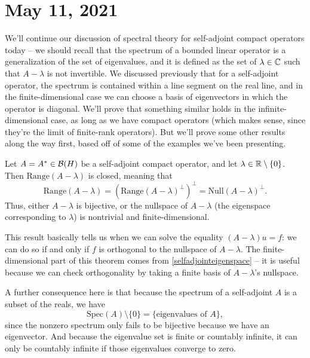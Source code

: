 \pagebreak\section*{May 11, 2021}

We'll continue our discussion of spectral theory for self-adjoint compact operators today -- we should recall that the spectrum of a bounded linear operator is a generalization of the set of eigenvalues, and it is defined as the set of $\lambda \in \mathbb C$ such that $A - \lambda$ is not invertible. We discussed previously that for a self-adjoint operator, the spectrum is contained within a line segment on the real line, and in the finite-dimensional case we can choose a basis of eigenvectors in which the operator is diagonal. We'll prove that something similar holds in the infinite-dimensional case, as long as we have compact operators (which makes sense, since they're the limit of finite-rank operators). But we'll prove some other results along the way first, based off of some of the examples we've been presenting.

\begin{theorem}
Let $A = A^\ast \in \mathcal{B}(H)$ be a self-adjoint compact operator, and let $\lambda \in \mathbb R \setminus \{0\}$. Then $\text{Range}(A - \lambda)$ is closed, meaning that
\[
    \text{Range}(A - \lambda) = (\text{Range}(A-\lambda)^\perp)^\perp = \text{Null}(A - \lambda)^\perp.
\]
Thus, either $A - \lambda$ is bijective, or the nullspace of $A - \lambda$ (the eigenspace corresponding to $\lambda$) is nontrivial and finite-dimensional.
\end{theorem}

This result basically tells us when we can solve the equality $(A - \lambda)u = f$: we can do so if and only if $f$ is orthogonal to the nullspace of $A - \lambda$. The finite-dimensional part of this theorem comes from \cref{selfadjointeigenspace} -- it is useful because we can check orthogonality by taking a finite basis of $A - \lambda$'s nullspace. 

A further consequence here is that because the spectrum of a self-adjoint $A$ is a subset of the reals, we have
\[
    \text{Spec}(A) \setminus \{0\} = \{\text{eigenvalues of }A\},
\]
since the nonzero spectrum only fails to be bijective because we have an eigenvector. And because the eigenvalue set is finite or countably infinite, it can only be countably infinite if those eigenvalues converge to zero. 

